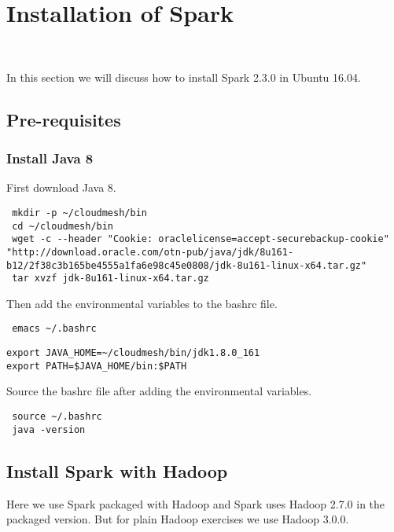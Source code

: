 \section{Installation of Spark}
\label{c:spark-local-installation}
\FILENAME\

In this section we will discuss how to install Spark 2.3.0 in Ubuntu 16.04.

\subsection{Pre-requisites}

\subsubsection{Install Java 8}

First download Java 8.

\begin{lstlisting}
 mkdir -p ~/cloudmesh/bin
 cd ~/cloudmesh/bin
 wget -c --header "Cookie: oraclelicense=accept-securebackup-cookie" "http://download.oracle.com/otn-pub/java/jdk/8u161-b12/2f38c3b165be4555a1fa6e98c45e0808/jdk-8u161-linux-x64.tar.gz"
 tar xvzf jdk-8u161-linux-x64.tar.gz
\end{lstlisting}

Then add the environmental variables to the bashrc file. 

\begin{lstlisting}
 emacs ~/.bashrc
\end{lstlisting}

\begin{lstlisting}
export JAVA_HOME=~/cloudmesh/bin/jdk1.8.0_161
export PATH=$JAVA_HOME/bin:$PATH
\end{lstlisting}

Source the bashrc file after adding the environmental variables.

\begin{lstlisting}
 source ~/.bashrc
 java -version
\end{lstlisting}

\subsection{Install Spark with Hadoop}

\begin{NOTE}
  Here we use Spark packaged with Hadoop and Spark uses Hadoop 2.7.0
  in the packaged version. But for plain Hadoop exercises we use
  Hadoop 3.0.0.
\end{NOTE}

